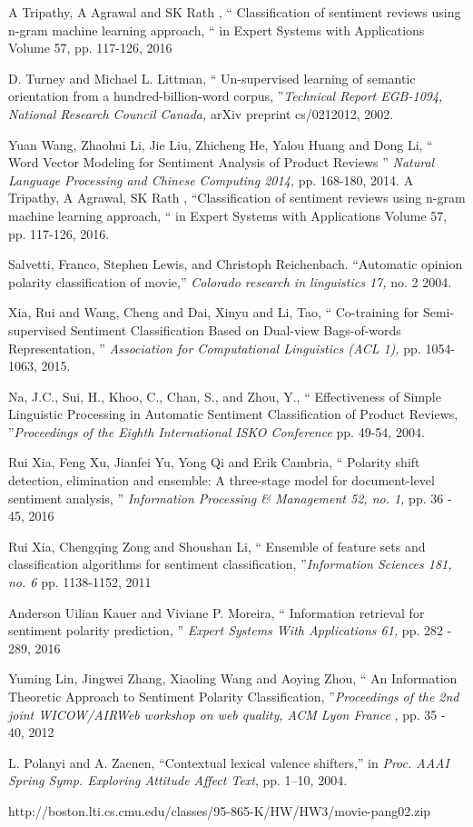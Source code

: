 \documentclass[oneside,a4paper,12pt]{pictreport}
\begin{document}
\begin{thebibliography}{20}
  A Tripathy, A Agrawal and SK Rath , `` Classification of sentiment reviews using 
n-gram machine learning approach, `` in Expert Systems with Applications
Volume 57, pp. 117-126, 2016
  
  D. Turney and Michael L. Littman, `` Un-supervised learning of semantic orientation from
a hundred-billion-word corpus, ''{\em Technical Report
EGB-1094, National Research Council Canada,} arXiv preprint cs/0212012, 2002.

  Yuan Wang, Zhaohui Li, Jie Liu, Zhicheng He, Yalou Huang and Dong Li,
 `` Word Vector Modeling for Sentiment Analysis
of Product Reviews '' {\em Natural Language Processing and Chinese Computing 2014,} pp. 168-180, 2014.
  A Tripathy, A Agrawal, SK Rath , ``Classification of sentiment reviews using 
n-gram machine learning approach, `` in Expert Systems with Applications
Volume 57, pp. 117-126, 2016.

 Salvetti, Franco, Stephen Lewis, and Christoph Reichenbach. 
``Automatic opinion polarity classification of movie,'' {\em Colorado research in linguistics 17,} no. 2 2004.

Xia, Rui and Wang, Cheng and Dai, Xinyu and Li, Tao, 
`` Co-training for Semi-supervised Sentiment Classification Based on Dual-view Bags-of-words Representation, ''
  {\em Association for Computational Linguistics (ACL 1),} pp. 1054-1063, 2015.
  
Na, J.C., Sui, H., Khoo, C., Chan, S., and Zhou, Y., `` Effectiveness of Simple Linguistic Processing in Automatic 
Sentiment Classification of Product Reviews, ''{\em Proceedings 
of the Eighth International ISKO Conference
 } pp. 49-54, 2004.
 
 Rui Xia, Feng Xu, Jianfei Yu, Yong Qi and Erik Cambria, `` Polarity shift detection, elimination and ensemble:
A three-stage model for document-level sentiment analysis, '' {\em  Information Processing \& Management 52, no. 1, } pp. 36 - 45, 2016

Rui Xia, Chengqing Zong and Shoushan Li, `` Ensemble of feature sets and classification algorithms
for sentiment classification, ''{\em  Information Sciences 181, no. 6 } pp. 1138-1152, 2011

Anderson Uilian Kauer and Viviane P. Moreira, `` Information retrieval for sentiment polarity prediction, ''
{\em Expert Systems With Applications 61,} pp. 282 - 289, 2016

Yuming Lin, Jingwei Zhang, Xiaoling Wang and Aoying Zhou, `` An Information Theoretic Approach to Sentiment Polarity
Classification, ''{\em Proceedings of the 2nd joint WICOW/AIRWeb workshop on web quality, ACM Lyon France }, pp. 35 - 40, 2012


L. Polanyi and A. Zaenen, ``Contextual lexical valence shifters,'' in
{\em Proc. AAAI Spring Symp. Exploring Attitude Affect Text}, pp. 1–10, 2004.

http://boston.lti.cs.cmu.edu/classes/95-865-K/HW/HW3/movie-pang02.zip
\end{thebibliography}
\end{document}
